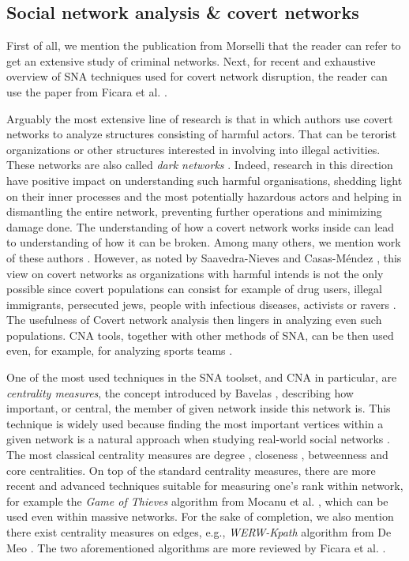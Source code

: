 \subsection{Social network analysis \& covert networks}

First of all, we mention the publication from Morselli \cite{Morselli2009} that the reader can refer to get
an extensive study of criminal networks.
Next, for recent and exhaustive overview of SNA techniques used for covert network disruption,
the reader can use the paper from Ficara et al. \cite{Ficara2022}.

Arguably the most extensive line of research is that in which authors use covert networks to analyze structures consisting of
harmful actors.
That can be terorist organizations or other structures interested in involving into illegal activities. These networks are
also called \emph{dark networks} \cite{Raab2003}.
Indeed, research in this direction have positive impact on understanding such harmful organisations,
shedding light on their inner processes and the most potentially hazardous actors and helping in dismantling the entire network,
preventing further operations and minimizing damage done.
The understanding of how a covert network works inside can lead to understanding of how it can be broken.
Among many others, we mention work of these authors \cite{Waniek2017,Dey2019,Raab2003,Lindelauf2009,Xu2005,Ressler2006, SaavedraNieves2023}.
However, as noted by Saavedra-Nieves and Casas-Méndez \cite{SaavedraNieves2023}, this view on covert networks as organizations with harmful
intends is not the only possible since covert populations can consist for example of drug users, illegal immigrants, persecuted jews,
people with infectious diseases, activists or ravers \cite{Oliver2014}.
The usefulness of Covert network analysis then lingers in analyzing even such populations.
CNA tools, together with other methods of SNA, can be then used even, for example, for analyzing sports teams \cite{Buldú2019}.

One of the most used techniques in the SNA toolset, and CNA in particular, are \emph{centrality measures},
the concept introduced by Bavelas \cite{Bavelas1948},
describing how important, or central, the member of given network inside this network is.
This technique is widely used because finding the most important vertices within a given network is a natural approach when studying real-world social networks \cite{Crescenzi2016}.
The most classical centrality measures are degree \cite{Shaw1954}, closeness \cite{Beauchamp1965},
betweenness \cite{Anthonisse1971,Freeman1977} and core \cite{Seidman1983} centralities.
On top of the standard centrality measures, there are more recent and advanced techniques suitable for measuring one's rank within network,
for example the \emph{Game of Thieves} algorithm from Mocanu et al. \cite{Mocanu2018}, which can be used even within massive networks.
For the sake of completion, we also mention there exist centrality measures on edges, e.g.,
\emph{WERW-Kpath} algorithm from {De Meo} \cite{DeMeo2013}.
The two aforementioned algorithms are more reviewed by Ficara et al. \cite{Ficara2021}.

